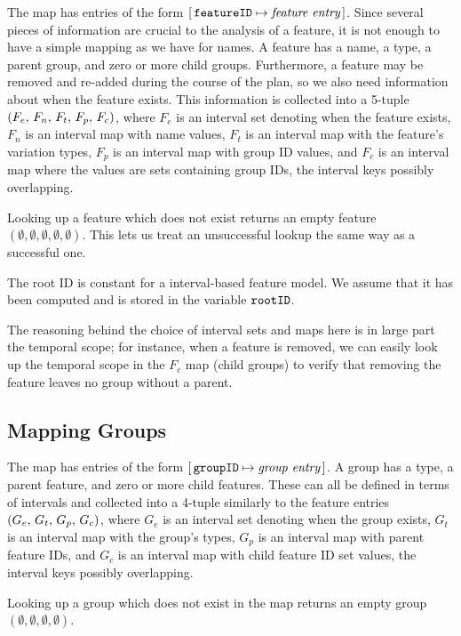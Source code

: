 The \features{} map has entries of the form $[ \,\texttt{featureID} \mapsto \textit{feature entry}\, ]$. Since several pieces of information are crucial to the analysis of a feature, it is not enough to have a simple mapping as we have for names.
A feature has a name, a type, a parent group, and zero or more child groups. Furthermore, a feature may be removed and re-added during the course of the plan, so we also need information about when the feature exists.
This information is collected into a 5-tuple $\left(F_e,\, F_n,\, F_t,\, F_p,\, F_c\right)$, where $F_e$ is an interval set denoting when the feature exists, $F_n$ is an interval map with name values, $F_t$ is an interval map with the feature's variation types, $F_p$ is an interval map with group ID values, and $F_c$ is an interval map where the values are sets containing group IDs, the interval keys possibly overlapping.

Looking up a feature which does not exist returns an empty feature $(\emptyset \comma \emptyset \comma \emptyset \comma \emptyset \comma \emptyset)$. This lets us treat an unsuccessful lookup the same way as a successful one.

The root ID is constant for a interval-based feature model. We assume that it has been computed and is stored in the variable $\texttt{rootID}$. 

The reasoning behind the choice of interval sets and maps here is in large part the temporal scope; for instance, when a feature is removed, we can easily look up the temporal scope in the $F_c$ map (child groups) to verify that removing the feature leaves no group without a parent.

\subsection{Mapping Groups}
\label{sub:mapping-groups}

The \groups{} map has entries of the form $[ \,\texttt{groupID} \mapsto \textit{group entry}\, ]$. A group has a type, a parent feature, and zero or more child features. These can all be defined in terms of intervals and collected into a 4-tuple similarly to the feature entries $\left(G_e,\, G_t,\, G_p,\, G_c\right)$, where $G_e$ is an interval set denoting when the group exists, $G_t$ is an interval map with the group's types, $G_p$ is an interval map with parent feature IDs, and $G_c$ is an interval map with child feature ID set values, the interval keys possibly overlapping.

Looking up a group which does not exist in the map returns an empty group $(\emptyset \comma \emptyset \comma \emptyset \comma \emptyset)$. 

